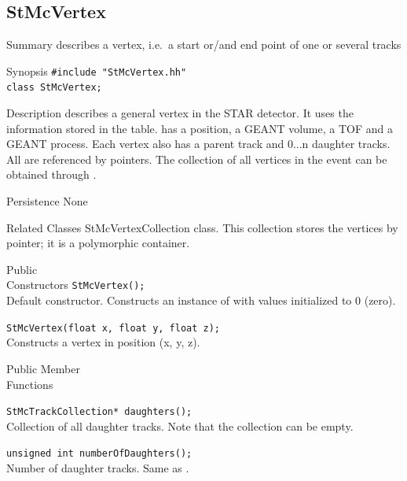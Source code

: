 \subsection{StMcVertex}
\label{sec:StMcVertex}
\begin{Entry}
\item[Summary]
     describes a vertex, i.e.~a start or/and end point of one
    or several tracks

\item[Synopsis]
    \verb+#include "StMcVertex.hh"+\\
    \verb+class StMcVertex;+\\

\item[Description]
         describes a general vertex in the STAR detector.
    It uses the information stored in the 
    table.  has a position, a
    GEANT volume, a TOF and a GEANT process. Each vertex also has
    a parent track and 0...n daughter tracks. All are
    referenced by pointers.
    The collection of all vertices in the event can be obtained
    through .

\item[Persistence]
    None

\item[Related Classes]
    StMcVertexCollection class. This collection stores the
    vertices by pointer; it is a polymorphic container.

\item[Public\\ Constructors]
    \verb+StMcVertex();+\\
    Default constructor. Constructs an instance of  with
    values initialized to 0 (zero).

    \verb+StMcVertex(float x, float y, float z);+\\
    Constructs a vertex in position (x, y, z).

\item[Public Member\\ Functions]

    \verb+StMcTrackCollection* daughters();+\\
    Collection of all daughter tracks. Note that
    the collection can be empty.

    \verb+unsigned int numberOfDaughters();+\\
    Number of daughter tracks. Same as .


\end{Entry}
